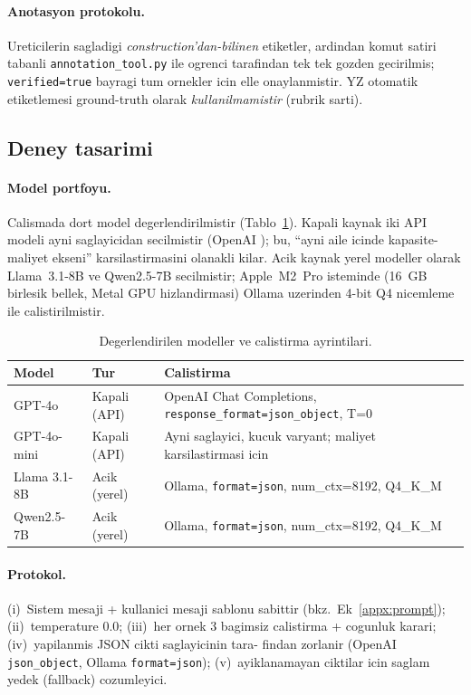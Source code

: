 \documentclass[11pt,a4paper]{article}
\begin{document}
\paragraph{Anotasyon protokolu.} Ureticilerin sagladigi
\emph{construction'dan-bilinen} etiketler, ardindan komut satiri tabanli
\texttt{annotation\_tool.py} ile ogrenci tarafindan tek tek gozden gecirilmis;
\texttt{verified=true} bayragi tum ornekler icin elle onaylanmistir. YZ
otomatik etiketlemesi ground-truth olarak \emph{kullanilmamistir} (rubrik
sarti).

\subsection{Deney tasarimi}
\label{sub:deney}
\paragraph{Model portfoyu.} Calismada dort model degerlendirilmistir
(Tablo~\ref{tab:models}). Kapali kaynak iki API modeli ayni saglayicidan
secilmistir (OpenAI \cite{openai2023gpt4}); bu, ``ayni aile icinde
kapasite-maliyet ekseni'' karsilastirmasini olanakli kilar. Acik kaynak yerel
modeller olarak Llama~3.1-8B \cite{touvron2023llama2} ve Qwen2.5-7B
\cite{qwen25} secilmistir; Apple~M2~Pro isteminde (16~GB birlesik bellek,
Metal GPU hizlandirmasi) Ollama uzerinden 4-bit Q4 nicemleme ile
calistirilmistir.

\begin{table}[t]
\caption{Degerlendirilen modeller ve calistirma ayrintilari.}
\label{tab:models}\small
\begin{tabularx}{\columnwidth}{l l X}
\toprule
\textbf{Model} & \textbf{Tur} & \textbf{Calistirma} \\
\midrule
GPT-4o            & Kapali (API) & OpenAI Chat Completions, \texttt{response\_format=json\_object}, T=0 \\
GPT-4o-mini       & Kapali (API) & Ayni saglayici, kucuk varyant; maliyet karsilastirmasi icin \\
Llama 3.1-8B      & Acik (yerel) & Ollama, \texttt{format=json}, num\_ctx=8192, Q4\_K\_M \\
Qwen2.5-7B        & Acik (yerel) & Ollama, \texttt{format=json}, num\_ctx=8192, Q4\_K\_M \\
\bottomrule
\end{tabularx}
\end{table}

\paragraph{Protokol.} (i)~Sistem mesaji + kullanici mesaji sablonu sabittir
(bkz.~Ek~\ref{appx:prompt}); (ii)~temperature 0.0; (iii)~her ornek 3 bagimsiz
calistirma + cogunluk karari; (iv)~yapilanmis JSON cikti saglayicinin tara-
findan zorlanir (OpenAI \texttt{json\_object}, Ollama \texttt{format=json});
(v)~ayiklanamayan ciktilar icin saglam yedek (fallback) cozumleyici.
\end{document}
